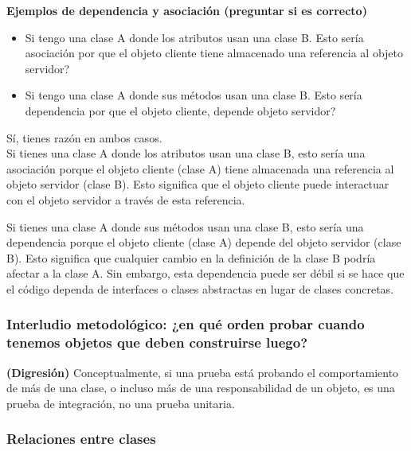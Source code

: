 \documentclass[../main.tex]{subfiles}
\begin{document}
            \begin{example} \textbf{Ejemplos de dependencia y asociación (preguntar si es correcto)}
                \begin{itemize}
                    \item Si tengo una clase A donde los atributos usan una clase B. Esto sería asociación por que el objeto cliente tiene almacenado una referencia al objeto servidor?
                    \item Si tengo una clase A donde sus métodos usan una clase B. Esto sería dependencia por que el objeto cliente, depende objeto servidor?
                \end{itemize}

                Sí, tienes razón en ambos casos.\\

                Si tienes una clase A donde los atributos usan una clase B, esto sería una asociación porque el objeto cliente (clase A) tiene almacenada una referencia al objeto servidor (clase B). Esto significa que el objeto cliente puede interactuar con el objeto servidor a través de esta referencia.

                Si tienes una clase A donde sus métodos usan una clase B, esto sería una dependencia porque el objeto cliente (clase A) depende del objeto servidor (clase B). Esto significa que cualquier cambio en la definición de la clase B podría afectar a la clase A. Sin embargo, esta dependencia puede ser débil si se hace que el código dependa de interfaces o clases abstractas en lugar de clases concretas.
            \end{example}

        \subsubsection{Interludio metodológico: ¿en qué orden probar cuando tenemos objetos que deben construirse luego?}
            \begin{definition} \textbf{(Digresión)}
                Conceptualmente, si una prueba está probando el comportamiento de más de una clase, o incluso más de una responsabilidad de un objeto, es una prueba de integración, no una prueba unitaria.
            \end{definition}

        \subsubsection{Relaciones entre clases}
\end{document}
